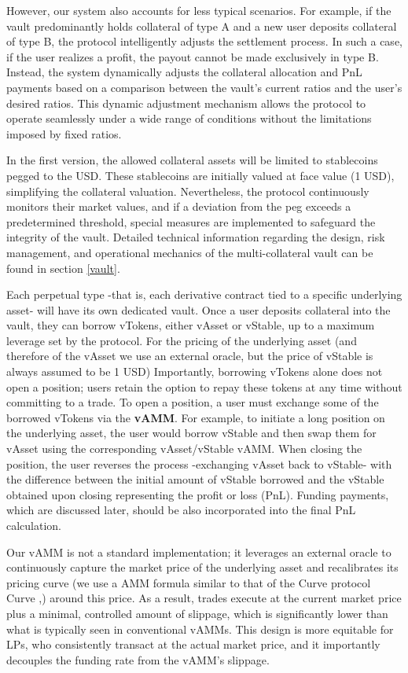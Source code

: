 \documentclass{article}
\begin{document}
However, our system also accounts for less typical scenarios. For example, if the vault predominantly holds collateral of type A and a new user deposits collateral of type B, the protocol intelligently adjusts the settlement process. In such a case, if the user realizes a profit, the payout cannot be made exclusively in type B. Instead, the system dynamically adjusts the collateral allocation and PnL payments based on a comparison between the vault’s current ratios and the user’s desired ratios. This dynamic adjustment mechanism allows the protocol to operate seamlessly under a wide range of conditions without the limitations imposed by fixed ratios.

In the first version, the allowed collateral assets will be limited to stablecoins pegged to the USD. These stablecoins are initially valued at face value (1 USD), simplifying the collateral valuation. Nevertheless, the protocol continuously monitors their market values, and if a deviation from the peg exceeds a predetermined threshold, special measures are implemented to safeguard the integrity of the vault. Detailed technical information regarding the design, risk management, and operational mechanics of the multi-collateral vault can be found in section \ref{vault}.

Each perpetual type -that is, each derivative contract tied to a specific underlying asset- will have its own dedicated vault. Once a user deposits collateral into the vault, they can borrow vTokens, either vAsset or vStable, up to a maximum leverage set by the protocol. For the pricing of the underlying asset (and therefore of the vAsset we use an external oracle, but the price of vStable is always assumed to be 1 USD) Importantly, borrowing vTokens alone does not open a position; users retain the option to repay these tokens at any time without committing to a trade. To open a position, a user must exchange some of the borrowed vTokens via the \textbf{vAMM}. For example, to initiate a long position on the underlying asset, the user would borrow vStable and then swap them for vAsset using the corresponding vAsset/vStable vAMM. When closing the position, the user reverses the process -exchanging vAsset back to vStable- with the difference between the initial amount of vStable borrowed and the vStable obtained upon closing representing the profit or loss (PnL). Funding payments, which are discussed later, should be also incorporated into the final PnL calculation.

Our vAMM is not a standard implementation; it leverages an external oracle to continuously capture the market price of the underlying asset and recalibrates its pricing curve (we use a AMM formula similar to that of the Curve protocol Curve \cite{StableSwap},\cite{CryptoSwap}) around this price. As a result, trades execute at the current market price plus a minimal, controlled amount of slippage, which is significantly lower than what is typically seen in conventional vAMMs. This design is more equitable for LPs, who consistently transact at the actual market price, and it importantly decouples the funding rate from the vAMM's slippage.
\end{document}
